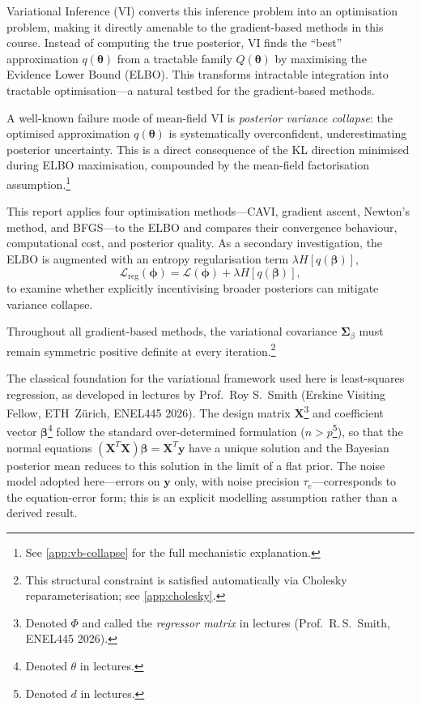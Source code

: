 \documentclass[11pt,a4paper]{article}
\begin{document}
Variational Inference (VI) converts this inference problem into an optimisation problem, making it directly amenable to the gradient-based methods in this course.
Instead of computing the true posterior, VI finds the ``best'' approximation $q(\bm{\theta})$ from a tractable family $Q(\bm{\theta})$
by maximising the Evidence Lower Bound (ELBO). 
This transforms intractable integration into tractable optimisation---a natural testbed for the gradient-based methods.

A well-known failure mode of mean-field VI is \emph{posterior variance collapse}:
the optimised approximation $q(\bm{\theta})$ is systematically overconfident,
underestimating posterior uncertainty. This is a direct consequence of the KL direction minimised during ELBO maximisation,
compounded by the mean-field factorisation assumption.\footnote{See \ref{app:vb-collapse} for the full mechanistic explanation.}

This report applies four optimisation methods---CAVI, gradient ascent, Newton's method, and BFGS---to the ELBO and compares their convergence behaviour, computational cost, and posterior quality.
As a secondary investigation, the ELBO is augmented with an entropy regularisation term $\lambda H[q(\bm{\beta})]$,
\begin{equation*}
    \mathcal{L}_{\mathrm{reg}}(\bm{\phi}) = \mathcal{L}(\bm{\phi}) + \lambda H[q(\bm{\beta})],
\end{equation*}
to examine whether explicitly incentivising broader posteriors can mitigate variance collapse.

Throughout all gradient-based methods, the variational covariance $\bm{\Sigma}_\beta$ must remain symmetric positive definite at every iteration.\footnote{This structural constraint is satisfied automatically via Cholesky reparameterisation; see \ref{app:cholesky}.}

The classical foundation for the variational framework used here is least-squares regression,
as developed in lectures by Prof.\ Roy S.\ Smith (Erskine Visiting Fellow, ETH~Z\"{u}rich,
ENEL445 2026). The design matrix $\bm{X}$\footnote{Denoted $\Phi$ and called the
\emph{regressor matrix} in lectures (Prof.\ R.\,S.\ Smith, ENEL445 2026).} and coefficient
vector $\bm{\beta}$\footnote{Denoted $\theta$ in lectures.} follow the standard
over-determined formulation ($n > p$\footnote{Denoted $d$ in lectures.}), so that the normal
equations $(\bm{X}^T\bm{X})\bm{\beta} = \bm{X}^T\bm{y}$ have a unique solution and the
Bayesian posterior mean reduces to this solution in the limit of a flat prior. The noise model
adopted here---errors on $\bm{y}$ only, with noise precision $\tau_e$---corresponds to the
equation-error form; this is an explicit modelling assumption rather than a derived result.
\end{document}
